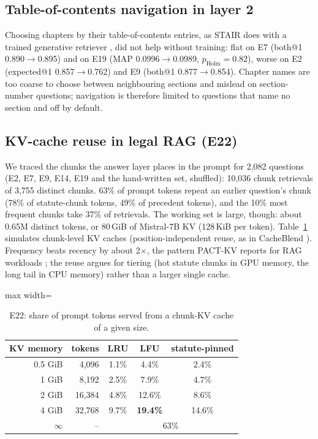 \documentclass[sigconf,nonacm]{acmart}
\newcommand{\ph}{p_{\text{Holm}}}
\begin{document}
\subsection{Table-of-contents navigation in layer 2}\label{sec:res-toc}

Choosing chapters by their table-of-contents entries, as STAIR does with a trained generative
retriever \cite{stair}, did not help without training: flat on E7 (both@1 0.890$\to$0.895) and on E19
(MAP 0.0996$\to$0.0989, $\ph=0.82$), worse on E2 (expected@1 0.857$\to$0.762) and E9 (both@1
0.877$\to$0.854). Chapter names are too coarse to choose between neighbouring sections and mislead on
section-number questions; navigation is therefore limited to questions that name no section and
off by default.

\subsection{KV-cache reuse in legal RAG (E22)}

We traced the chunks the answer layer places in the prompt for 2,082 questions (E2, E7, E9, E14,
E19 and the hand-written set, shuffled): 10,036 chunk retrievals of 3,755 distinct chunks. 63\% of
prompt tokens repeat an earlier question's chunk (78\% of statute-chunk tokens, 49\% of precedent
tokens), and the 10\% most frequent chunks take 37\% of retrievals. The working set is large, though:
about 0.65M distinct tokens, or 80\,GiB of Mistral-7B KV (128\,KiB per token). Table~\ref{tab:kv}
simulates chunk-level KV caches (position-independent reuse, as in CacheBlend \cite{cacheblend}).
Frequency beats recency by about 2$\times$, the pattern PACT-KV reports for RAG workloads
\cite{pactkv}; the reuse argues for tiering (hot statute chunks in GPU memory, the long tail in CPU
memory) rather than a larger single cache.

\begin{table}[t]
\centering\small
\caption{E22: share of prompt tokens served from a chunk-KV cache of a given size.}
\label{tab:kv}
\begin{adjustbox}{max width=\linewidth}
\begin{tabular}{rrccc}
\toprule
KV memory & tokens & LRU & LFU & statute-pinned \\
\midrule
0.5 GiB & 4,096 & 1.1\% & 4.4\% & 2.4\% \\
1 GiB & 8,192 & 2.5\% & 7.9\% & 4.7\% \\
2 GiB & 16,384 & 4.8\% & 12.6\% & 8.6\% \\
4 GiB & 32,768 & 9.7\% & \textbf{19.4\%} & 14.6\% \\
$\infty$ & -- & \multicolumn{3}{c}{63\%} \\
\bottomrule
\end{tabular}
\end{adjustbox}
\end{table}
\end{document}

